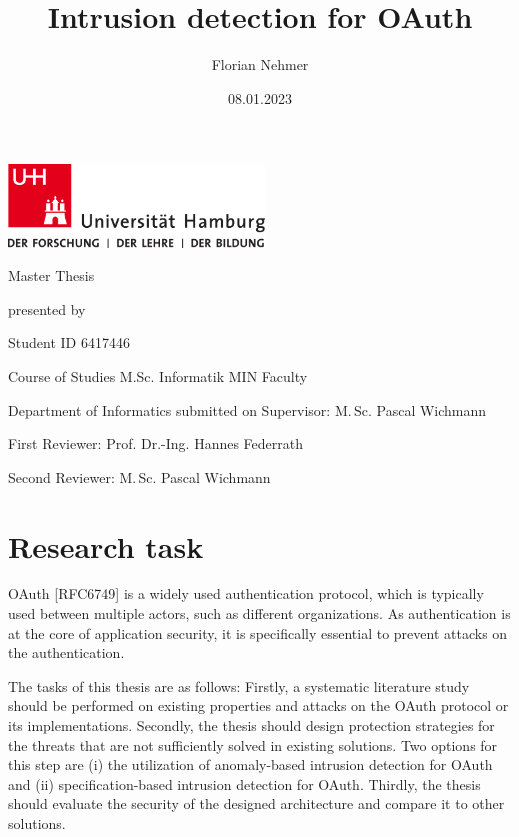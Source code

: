 \documentclass[
    fontsize=12pt,
    headings=small,
    parskip=half,           %
    bibliography=totoc,
    numbers=noenddot,       %
    open=any,               %
	final                   %
    ]{scrreprt}
\title{Intrusion detection for OAuth}
\author{Florian Nehmer}
\date{08.01.2023} %
\begin{document}
\begin{titlepage}%
	\includegraphics[width=6.8cm]{./pic/up-uhh-logo-u-2010-u-farbe-u-rgb.pdf}
	\begin{center}\Large
		\vfill
		Master Thesis
		\vfill
		\makeatletter
		{\Large\textsf{\textbf{\@title}}\par}
		\makeatother
		\vfill
		presented by
		\par\bigskip
		\makeatletter
		{\@author} \par
		\makeatother
		Student ID 6417446 \par
		Course of Studies M.Sc. Informatik
		\vfill
		MIN Faculty \par
		Department of Informatics
		\vfill
		\makeatletter
		submitted on {\@date}
		\makeatother
		\vfill
		Supervisor: M.\,Sc. Pascal Wichmann \par
		First Reviewer: Prof. Dr.-Ing. Hannes Federrath \par
		Second Reviewer: M.\,Sc. Pascal Wichmann
	\end{center}
\end{titlepage}%

\chapter*{Research task}
OAuth [RFC6749] is a widely used authentication protocol, which is typically used between multiple actors, such as different organizations. As authentication is at the core of application security, it is specifically essential to prevent attacks on the authentication.

The tasks of this thesis are as follows: Firstly, a systematic literature study should be performed on existing properties and attacks on the OAuth protocol or its implementations. Secondly, the thesis should design protection strategies for the threats that are not sufficiently solved in existing solutions. Two options for this step are (i) the utilization of anomaly-based intrusion detection for OAuth and (ii) specification-based intrusion detection for OAuth. Thirdly, the thesis should evaluate the security of the designed architecture and compare it to other solutions.
\end{document}
